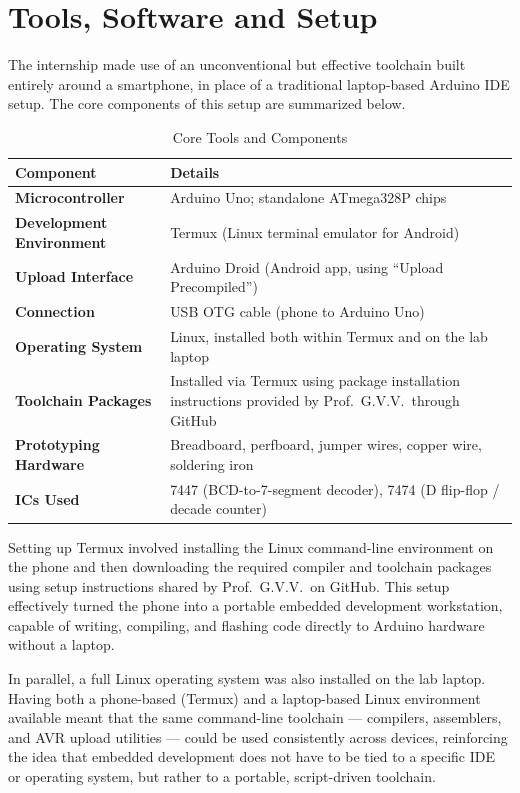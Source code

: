 \documentclass[12pt,a4paper]{report}
\begin{document}
\chapter{Tools, Software and Setup}
\label{ch:tools}

The internship made use of an unconventional but effective toolchain built entirely around a smartphone, in place of a traditional laptop-based Arduino IDE setup. The core components of this setup are summarized below.

\begin{table}[H]
\centering
\caption{Core Tools and Components}
\label{tab:tools}
\begin{tabular}{@{}>{\bfseries}p{3.6cm}p{10.5cm}@{}}
\toprule
Component & \textbf{Details} \\
\midrule
Microcontroller & Arduino Uno; standalone ATmega328P chips \\
Development Environment & Termux (Linux terminal emulator for Android) \\
Upload Interface & Arduino Droid (Android app, using ``Upload Precompiled'') \\
Connection & USB OTG cable (phone to Arduino Uno) \\
Operating System & Linux, installed both within Termux and on the lab laptop \\
Toolchain Packages & Installed via Termux using package installation instructions provided by Prof.\ G.V.V.\ through GitHub \\
Prototyping Hardware & Breadboard, perfboard, jumper wires, copper wire, soldering iron \\
ICs Used & 7447 (BCD-to-7-segment decoder), 7474 (D flip-flop / decade counter) \\
\bottomrule
\end{tabular}
\end{table}

Setting up Termux involved installing the Linux command-line environment on the phone and then downloading the required compiler and toolchain packages using setup instructions shared by Prof.\ G.V.V.\ on GitHub. This setup effectively turned the phone into a portable embedded development workstation, capable of writing, compiling, and flashing code directly to Arduino hardware without a laptop.

In parallel, a full Linux operating system was also installed on the lab laptop. Having both a phone-based (Termux) and a laptop-based Linux environment available meant that the same command-line toolchain --- compilers, assemblers, and AVR upload utilities --- could be used consistently across devices, reinforcing the idea that embedded development does not have to be tied to a specific IDE or operating system, but rather to a portable, script-driven toolchain.
\end{document}
